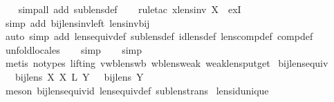 \begin{isabellebody}
\ \ \isamarkupfalse%
\ {\isacharparenleft}simp{\isacharunderscore}all\ add{\isacharcolon}\ sublens{\isacharunderscore}def{\isacharparenright}\isanewline
\ \ \isamarkupfalse%
\ {\isacharparenleft}rule{\isacharunderscore}tac\ x{\isacharequal}{\isachardoublequoteopen}lens{\isacharunderscore}inv\ X{\isachardoublequoteclose}\ \ exI{\isacharparenright}\isanewline
\ \ \isamarkupfalse%
\ {\isacharparenleft}simp\ add{\isacharcolon}\ bij{\isacharunderscore}lens{\isacharunderscore}inv{\isacharunderscore}left\ lens{\isacharunderscore}inv{\isacharunderscore}bij{\isacharparenright}\isanewline
\ \ \isamarkupfalse%
\ {\isacharparenleft}auto\ simp\ add{\isacharcolon}\ lens{\isacharunderscore}equiv{\isacharunderscore}def\ sublens{\isacharunderscore}def\ id{\isacharunderscore}lens{\isacharunderscore}def\ lens{\isacharunderscore}comp{\isacharunderscore}def\ comp{\isacharunderscore}def{\isacharparenright}\isanewline
\ \ \isamarkupfalse%
\ {\isacharparenleft}unfold{\isacharunderscore}locales{\isacharparenright}\isanewline
\ \ \isamarkupfalse%
\ {\isacharparenleft}simp{\isacharparenright}\isanewline
\ \ \isamarkupfalse%
\ {\isacharparenleft}simp{\isacharparenright}\isanewline
\ \ \isamarkupfalse%
\ {\isacharparenleft}metis\ {\isacharparenleft}no{\isacharunderscore}types{\isacharcomma}\ lifting{\isacharparenright}\ vwb{\isacharunderscore}lens{\isacharunderscore}wb\ wb{\isacharunderscore}lens{\isacharunderscore}weak\ weak{\isacharunderscore}lens{\isachardot}put{\isacharunderscore}get{\isacharparenright}\isanewline
{}\isamarkupfalse%
%
\endisatagproof
{\isafoldproof}%
%
\isadelimproof
\isanewline
%
\endisadelimproof
\isanewline
{}\isamarkupfalse%
\ bij{\isacharunderscore}lens{\isacharunderscore}equiv{\isacharcolon}\isanewline
\ \ {\isachardoublequoteopen}{\isasymlbrakk}\ bij{\isacharunderscore}lens\ X{\isacharsemicolon}\ X\ {\isasymapprox}\isactrlsub L\ Y\ {\isasymrbrakk}\ {\isasymLongrightarrow}\ bij{\isacharunderscore}lens\ Y{\isachardoublequoteclose}\isanewline
%
\isadelimproof
\ \ %
\endisadelimproof
%
\isatagproof
{}\isamarkupfalse%
\ {\isacharparenleft}meson\ bij{\isacharunderscore}lens{\isacharunderscore}equiv{\isacharunderscore}id\ lens{\isacharunderscore}equiv{\isacharunderscore}def\ sublens{\isacharunderscore}trans{\isacharparenright}%
\endisatagproof
{\isafoldproof}%
%
\isadelimproof
\isanewline
%
\endisadelimproof
\isanewline
{}\isamarkupfalse%
\ lens{\isacharunderscore}id{\isacharunderscore}unique{\isacharcolon}\isanewline

\end{isabellebody}
